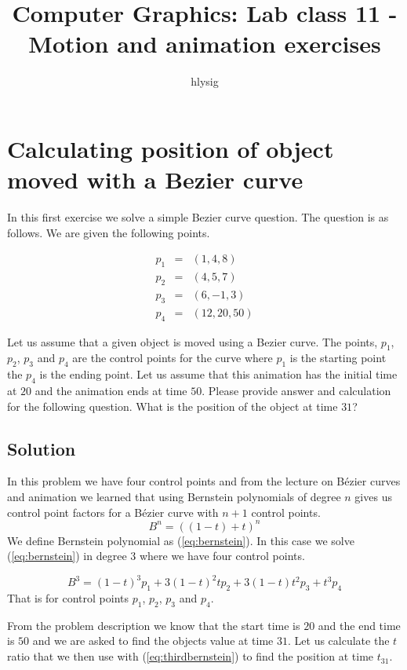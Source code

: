 \documentclass[12pt]{article}
\title{Computer Graphics: Lab class 11 - Motion and animation exercises}
\author{hlysig}
\begin{document}
\maketitle

\section{Calculating position of object moved with a Bezier curve}
In this first exercise we solve a simple Bezier curve question. The question is as follows.
We are given the following points.

\begin{eqnarray*}
p_1 &=& (1,4,8)\\
p_2 &=& (4,5,7)\\
p_3 &=& (6,-1, 3)\\
p_4 &=& (12,20,50)
\end{eqnarray*}

Let us assume that a given object is moved using a Bezier curve. The points, $p_1$, $p_2$, $p_3$ and
$p_4$ are the control points for the curve where $p_1$ is the starting point the $p_4$ is the ending point. Let us assume that this animation has the initial time at $20$ and the animation ends at time $50$. Please provide answer and calculation for the following question. What is the position of the object at time $31$?

\subsection{Solution}
In this problem we have four control points and from the lecture on Bézier curves and animation we learned that using Bernstein polynomials of degree $n$ gives us control point factors for a Bézier curve with $n+1$ control points.
\begin{equation}\label{eq:bernstein}
    B^n = \left( \left( 1-t \right)+t \right)^n
\end{equation}
We define Bernstein polynomial as (\ref{eq:bernstein}). In this case we solve (\ref{eq:bernstein}) in degree $3$ where we have four control points.

\begin{equation}\label{eq:thirdbernstein}
    B^3 = (1-t)^3 p_1 + 3(1-t)^2 t p_2 + 3(1-t) t^2 p_3 + t^3 p_4
\end{equation}
That is for control points $p_1$, $p_2$, $p_3$ and $p_4$.

From the problem description we know that the start time is $20$ and the end time is $50$ and
we are asked to find the objects value at time $31$. Let us calculate the $t$ ratio
that we then use with (\ref{eq:thirdbernstein}) to find the position at time $t_{31}$. 
\end{document}
